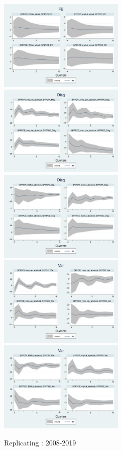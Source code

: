 \documentclass[]{article}
\begin{document}
\begin{figure}[h]
	\includegraphics[width=6cm]{figures/SPFFE_ashocks_post2007.png} \\
	\smallskip
	\includegraphics[width=6cm]{figures/SPFDisg_ab_ashocks_nmp_post2007.png} 
	\includegraphics[width=6cm]{figures/SPFDisg_ab_ashocks_post2007.png} \\
	\smallskip 
		\includegraphics[width=6cm]{figures/SPFVar_ab_ashocks_nmp_post2007.png} 
	\includegraphics[width=6cm]{figures/SPFVar_ab_ashocks_post2007.png} 
	\caption{ Replicating \cite{coibion2012can}: 2008-2019}
\end{figure}
\end{document}
